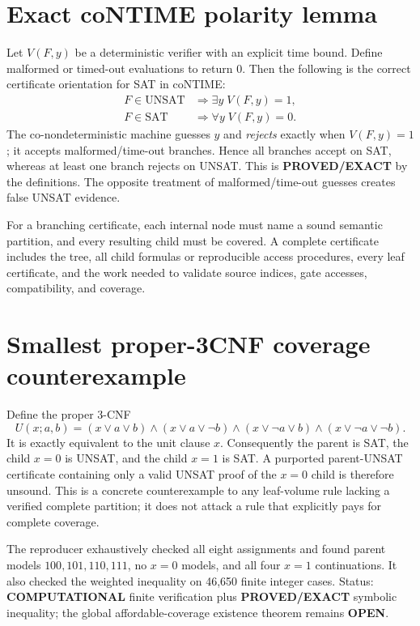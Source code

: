 \documentclass[11pt]{article}
\newcommand{\proved}{\textbf{PROVED/EXACT}}
\newcommand{\comp}{\textbf{COMPUTATIONAL}}
\newcommand{\openstatus}{\textbf{OPEN}}
\begin{document}
\section*{Exact coNTIME polarity lemma}
Let $V(F,y)$ be a deterministic verifier with an explicit time bound.  Define malformed
or timed-out evaluations to return $0$.  Then the following is the correct certificate
orientation for SAT in coNTIME:
\[
\begin{aligned}
F\in\mathrm{UNSAT}&\Longrightarrow \exists y\;V(F,y)=1,\\
F\in\mathrm{SAT}&\Longrightarrow \forall y\;V(F,y)=0.
\end{aligned}
\]
The co-nondeterministic machine guesses $y$ and \emph{rejects} exactly when
$V(F,y)=1$; it accepts malformed/time-out branches.  Hence all branches accept on SAT,
whereas at least one branch rejects on UNSAT.  This is \proved{} by the definitions.
The opposite treatment of malformed/time-out guesses creates false UNSAT evidence.

For a branching certificate, each internal node must name a sound semantic partition,
and every resulting child must be covered.  A complete certificate includes the tree,
all child formulas or reproducible access procedures, every leaf certificate, and the
work needed to validate source indices, gate accesses, compatibility, and coverage.

\section*{Smallest proper-3CNF coverage counterexample}
Define the proper 3-CNF
\[
U(x;a,b)=
(x\vee a\vee b)\wedge(x\vee a\vee\neg b)\wedge
(x\vee\neg a\vee b)\wedge(x\vee\neg a\vee\neg b).
\]
It is exactly equivalent to the unit clause $x$.  Consequently the parent is SAT,
the child $x=0$ is UNSAT, and the child $x=1$ is SAT.  A purported parent-UNSAT
certificate containing only a valid UNSAT proof of the $x=0$ child is therefore
unsound.  This is a concrete counterexample to any leaf-volume rule lacking a verified
complete partition; it does not attack a rule that explicitly pays for complete
coverage.

The reproducer exhaustively checked all eight assignments and found parent models
$100,101,110,111$, no $x=0$ models, and all four $x=1$ continuations.  It also checked
the weighted inequality on 46,650 finite integer cases.  Status: \comp{} finite
verification plus \proved{} symbolic inequality; the global affordable-coverage
existence theorem remains \openstatus.
\end{document}
